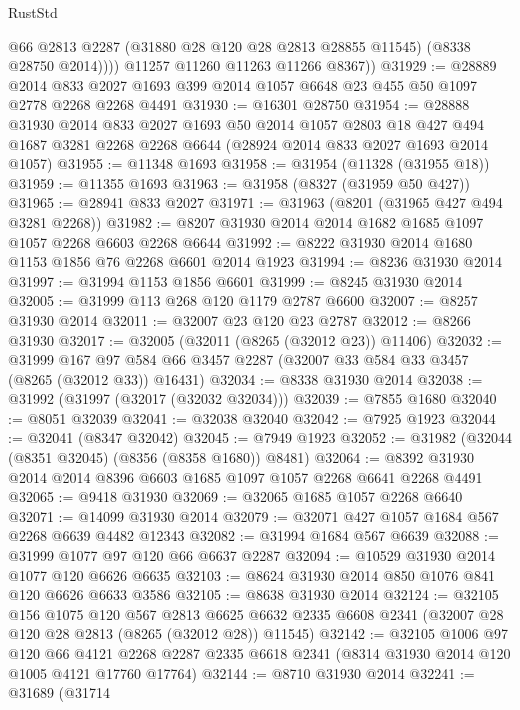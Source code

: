 \begin{lexlean}{RustStd}
\begin{coremodule}
{\begin{coremodule}
{{{{{{{{{{{{{{{{{{{{{{{{{{{{{{{{{{{{{{{{{{{{{{{{{{{{{{              @66
              @2813
              @2287
              (@31880 @28 @120 @28 @2813 @28855 @11545)
              (@8338 @28750 @2014))))
        @11257
        @11260
        @11263
        @11266
        @8367))
@31929 := @28889
    @2014
    @833
    @2027
    @1693
    @399
    @2014
    @1057
    @6648
    @23
    @455
    @50
    @1097
    @2778
    @2268
    @2268
    @4491
@31930 := @16301 @28750
@31954 := @28888
    @31930
    @2014
    @833
    @2027
    @1693
    @50
    @2014
    @1057
    @2803
    @18
    @427
    @494
    @1687
    @3281
    @2268
    @2268
    @6644
    (@28924 @2014 @833 @2027 @1693 @2014 @1057)
@31955 := @11348 @1693
@31958 := @31954 (@11328 (@31955 @18))
@31959 := @11355 @1693
@31963 := @31958 (@8327 (@31959 @50 @427))
@31965 := @28941 @833 @2027
@31971 := @31963 (@8201 (@31965 @427 @494 @3281 @2268))
@31982 := @8207 @31930 @2014 @2014 @1682 @1685 @1097 @1057 @2268 @6603 @2268 @6644
@31992 := @8222 @31930 @2014 @1680 @1153 @1856 @76 @2268 @6601 @2014 @1923
@31994 := @8236 @31930 @2014
@31997 := @31994 @1153 @1856 @6601
@31999 := @8245 @31930 @2014
@32005 := @31999 @113 @268 @120 @1179 @2787 @6600
@32007 := @8257 @31930 @2014
@32011 := @32007 @23 @120 @23 @2787
@32012 := @8266 @31930
@32017 := @32005 (@32011 (@8265 (@32012 @23)) @11406)
@32032 := @31999
    @167
    @97
    @584
    @66
    @3457
    @2287
    (@32007 @33 @584 @33 @3457 (@8265 (@32012 @33)) @16431)
@32034 := @8338 @31930 @2014
@32038 := @31992 (@31997 (@32017 (@32032 @32034)))
@32039 := @7855 @1680
@32040 := @8051 @32039
@32041 := @32038 @32040
@32042 := @7925 @1923
@32044 := @32041 (@8347 @32042)
@32045 := @7949 @1923
@32052 := @31982 (@32044 (@8351 @32045) (@8356 (@8358 @1680)) @8481)
@32064 := @8392 @31930 @2014 @2014 @8396 @6603 @1685 @1097 @1057 @2268 @6641 @2268 @4491
@32065 := @9418 @31930
@32069 := @32065 @1685 @1057 @2268 @6640
@32071 := @14099 @31930 @2014
@32079 := @32071 @427 @1057 @1684 @567 @2268 @6639 @4482 @12343
@32082 := @31994 @1684 @567 @6639
@32088 := @31999 @1077 @97 @120 @66 @6637 @2287
@32094 := @10529 @31930 @2014 @1077 @120 @6626 @6635
@32103 := @8624 @31930 @2014 @850 @1076 @841 @120 @6626 @6633 @3586
@32105 := @8638 @31930 @2014
@32124 := @32105
    @156
    @1075
    @120
    @567
    @2813
    @6625
    @6632
    @2335
    @6608
    @2341
    (@32007 @28 @120 @28 @2813 (@8265 (@32012 @28)) @11545)
@32142 := @32105
    @1006
    @97
    @120
    @66
    @4121
    @2268
    @2287
    @2335
    @6618
    @2341
    (@8314 @31930 @2014 @120 @1005 @4121 @17760 @17764)
@32144 := @8710 @31930 @2014
@32241 := @31689
    (@31714
}}}}}}}}}}}}}}}}}}}}}}}}}}}}}}}}}}}}}}}}}}}}}}}}}}}}}}
\end{coremodule}}
\end{coremodule}
\end{lexlean}
